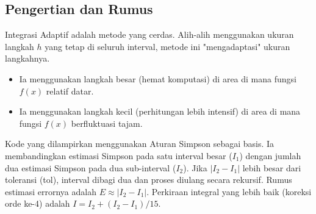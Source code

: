 \documentclass[a4paper, 11pt]{article} %
\begin{document}
\subsection{Pengertian dan Rumus} %
Integrasi Adaptif adalah metode yang cerdas. %
Alih-alih menggunakan ukuran langkah $h$ yang tetap di seluruh interval, metode ini "mengadaptasi" ukuran langkahnya. %
\begin{itemize}
    \item Ia menggunakan langkah besar (hemat komputasi) di area di mana fungsi $f(x)$ relatif datar. %
    \item Ia menggunakan langkah kecil (perhitungan lebih intensif) di area di mana fungsi $f(x)$ berfluktuasi tajam. %
\end{itemize}
Kode yang dilampirkan menggunakan Aturan Simpson sebagai basis. Ia membandingkan estimasi Simpson pada satu interval besar ($I_1$) dengan jumlah dua estimasi Simpson pada dua sub-interval ($I_2$). %
Jika $|I_2 - I_1|$ lebih besar dari toleransi (tol), interval dibagi dua dan proses diulang secara rekursif. %
Rumus estimasi errornya adalah $E \approx |I_2 - I_1|$. Perkiraan integral yang lebih baik (koreksi orde ke-4) adalah $I = I_2 + (I_2 - I_1)/15$. %
\end{document}

